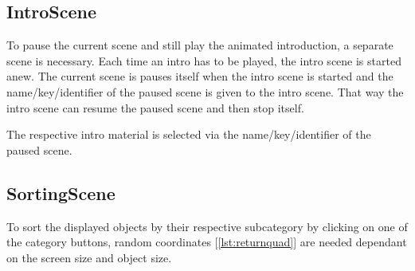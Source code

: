 \subsection{IntroScene}\label{subsec:introscene}
To pause the current scene and still play the animated introduction, a separate scene is necessary.
Each time an intro has to be played, the intro scene is started anew.
The current scene is pauses itself when the intro scene is started and the name/key/identifier
of the paused scene is given to the intro scene.
That way the intro scene can resume the paused scene and then stop itself.

The respective intro material is selected via the name/key/identifier of the paused scene.

\subsection{SortingScene}\label{subsec:sortingscene}
To sort the displayed objects by their respective subcategory by clicking on one of the category buttons,
random coordinates [\ref{lst:returnquad}] are needed dependant on the screen size and object size.

